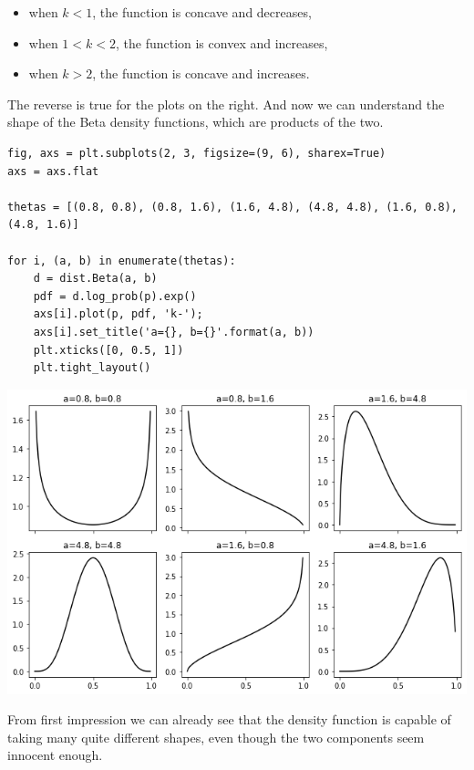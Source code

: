 \documentclass[11pt]{article}
\begin{document}
\begin{itemize}
\item when \(k<1\), the function is concave and decreases,
\item when \(1< k<2\), the function is convex and increases,
\item when \(k > 2\), the function is concave and increases.
\end{itemize}

The reverse is true for the plots on the right.
And now we can understand the shape of the Beta density functions, which are products of the two.

\begin{verbatim}
fig, axs = plt.subplots(2, 3, figsize=(9, 6), sharex=True)
axs = axs.flat

thetas = [(0.8, 0.8), (0.8, 1.6), (1.6, 4.8), (4.8, 4.8), (1.6, 0.8), (4.8, 1.6)]

for i, (a, b) in enumerate(thetas):
    d = dist.Beta(a, b)
    pdf = d.log_prob(p).exp()
    axs[i].plot(p, pdf, 'k-');
    axs[i].set_title('a={}, b={}'.format(a, b))
    plt.xticks([0, 0.5, 1])
    plt.tight_layout()
\end{verbatim}

\begin{center}
\includegraphics[width=.9\linewidth]{./.ob-jupyter/0aae13c28cf1a61c6aea2748c0539892205b758b.png}
\end{center}

From first impression we can already see that the density function is capable of taking many quite different shapes, even though the two components seem innocent enough.
\end{document}
